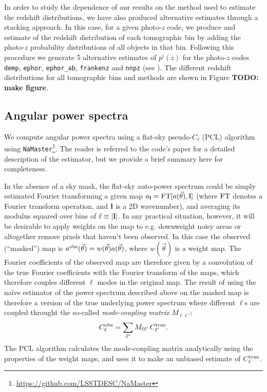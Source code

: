 \documentclass[a4paper,11pt]{article}
\newcommand{\nv}{\vec{\theta}}
\newcommand{\todo}[1]{{\bf TODO: #1}}
\begin{document}
    In order to study the dependence of our results on the method used to estimate the redshift distributions, we have also produced alternative estimates through a stacking approach. In this case, for a given photo-$z$ code, we produce and estimate of the redshift distribution of each tomographic bin by adding the photo-$z$ probability distributions of all objects in that bin. Following this procedure we generate 5 alternative estimates of $p^i(z)$ for the photo-$z$ codes {\tt demp}, {\tt ephor}, {\tt ephor\_ab}, {\tt frankenz} and {\tt nnpz} (see \cite{2018PASJ...70S...9T}). The different redshift distributions for all tomographic bins and methods are shown in Figure \todo{make figure}.

  \subsection{Angular power spectra}\label{ssec:methods.cell}
    We compute angular power spectra using a flat-sky pseudo-$C_\ell$ (PCL) algorithm \citep{2002ApJ...567....2H} using {\tt NaMaster}\footnote{\url{https://github.com/LSSTDESC/NaMaster}}. The reader is referred to the code's paper \cite{2019MNRAS.484.4127A} for a detailed description of the estimator, but we provide a brief summary here for completeness.
    
    In the absence of a sky mask, the flat-sky auto-power spectrum could be simply estimated Fourier transforming a given map $a_{\bf l}={\rm FT}[a(\nv),{\bf l}]$ (where ${\rm FT}$ denotes a Fourier transform operation, and ${\bf l}$ is a 2D wavenumber), and averaging its modulus squared over bins of $\ell\equiv|{\bf l}|$. In any practical situation, however, it will be desirable to apply weights on the map to e.g. downweight noisy areas or altogether remove pixels that haven't been observed. In this case the observed (``masked'') map is $a^{\rm obs}(\nv)=w(\nv)a(\nv)$, where $w(\nv)$ is a weight map. The Fourier coefficients of the observed map are therefore given by a convolution of the true Fourier coefficients with the Fourier transform of the maps, which therefore couples different $\ell$ modes in the original map. The result of using the na\"ive estimator of the power spectrum described above on the masked map is therefore a version of the true underlying power spectrum where different $\ell$s are coupled throught the so-called {\sl mode-coupling matrix} $M_{\ell\ell'}$:
    \begin{equation}
      C^{\rm obs}_\ell = \sum_{\ell'} M_{\ell\ell'}\,C^{\rm true}_{\ell'}.
    \end{equation}
    The PCL algorithm calculates the mode-coupling matrix analytically using the properties of the weight maps, and uses it to make an unbiased estimate of $C^{\rm true}_\ell$.
    
\end{document}
